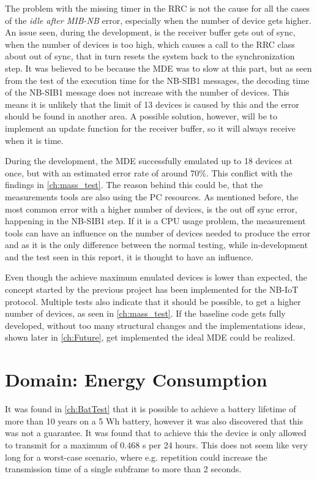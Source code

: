 The problem with the missing timer in the RRC is not the cause for all the cases of the \textit{idle after MIB-NB} error, especially when the number of device gets higher. An issue seen, during the development, is the receiver buffer gets out of sync, when the number of devices is too high, which causes a call to the RRC class about out of sync, that in turn resets the system back to the synchronization step. It was believed to be because the MDE was to slow at this part, but as seen from the test of the execution time for the NB-SIB1 messages, the decoding time of the NB-SIB1 message does not increase with the number of devices. This means it is unlikely that the limit of 13 devices is caused by this and the error should be found in another area. A possible solution, however, will be to implement an update function for the receiver buffer, so it will always receive when it is time.

During the development, the MDE successfully emulated up to 18 devices at once, but with an estimated error rate of around 70\%. This conflict with the findings in \autoref{ch:mass_test}. The reason behind this could be, that the measurements tools are also using the PC resources. As mentioned before, the most common error with a higher number of devices, is the out off sync error, happening in the NB-SIB1 step. If it is a CPU usage problem, the measurement tools can have an influence on the number of devices needed to produce the error and as it is the only difference between the normal testing, while in-development and the test seen in this report, it is thought to have an influence.

Even though the achieve maximum emulated devices is lower than expected, the concept started by the previous project has been implemented for the NB-IoT protocol. Multiple tests also indicate that it should be possible, to get a higher number of devices, as seen in \autoref{ch:mass_test}. If the baseline code gets fully developed, without too many structural changes and the implementations ideas, shown later in \autoref{ch:Future}, get implemented the ideal MDE could be realized. 



\section{Domain: Energy Consumption}
It was found in \autoref{ch:BatTest} that it is possible to achieve a battery lifetime of more than 10 years on a 5 Wh battery, however it was also discovered that this was not a guarantee. It was found that to achieve this the device is only allowed to transmit for a maximum of 0.468 s per 24 hours. This does not seem like very long for a worst-case scenario, where e.g. repetition could increase the transmission time of a single subframe to more than 2 seconds. 

